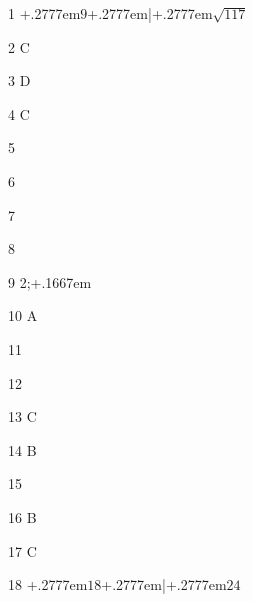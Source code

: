 \begin{Solution}{1}
\protect \leavevmode@ifvmode \kern +.2777em\relax $9$\protect \leavevmode@ifvmode \kern +.2777em\relax \big|\protect \leavevmode@ifvmode \kern +.2777em\relax $\sqrt {117}$
\end{Solution}
\begin{Solution}{2}
C
\end{Solution}
\begin{Solution}{3}
D
\end{Solution}
\begin{Solution}{4}
C
\end{Solution}
\begin{Solution}{5}
\end{Solution}
\begin{Solution}{6}
\end{Solution}
\begin{Solution}{7}
\end{Solution}
\begin{Solution}{8}
\end{Solution}
\begin{Solution}{9}
2;\protect \protect \leavevmode@ifvmode \kern +.1667em
\end{Solution}
\begin{Solution}{10}
A
\end{Solution}
\begin{Solution}{11}
\end{Solution}
\begin{Solution}{12}
\end{Solution}
\begin{Solution}{13}
C
\end{Solution}
\begin{Solution}{14}
B
\end{Solution}
\begin{Solution}{15}
\end{Solution}
\begin{Solution}{16}
B
\end{Solution}
\begin{Solution}{17}
C
\end{Solution}
\begin{Solution}{18}
\protect \leavevmode@ifvmode \kern +.2777em\relax $18$\protect \leavevmode@ifvmode \kern +.2777em\relax \big|\protect \leavevmode@ifvmode \kern +.2777em\relax $24$
\end{Solution}
